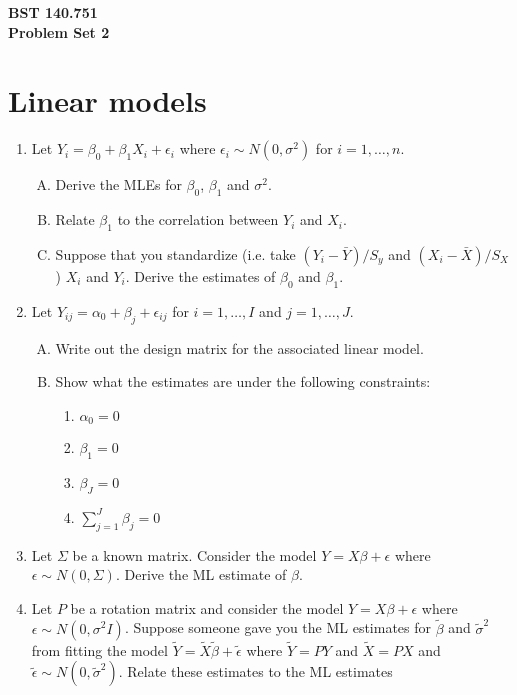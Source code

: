 \documentclass[12pt]{article}
\begin{document}
\noindent
{\bf BST 140.751 \\ Problem Set 2} \\

\section{Linear models}
\begin{enumerate}[1.]
\item Let $Y_i = \beta_0 + \beta_1 X_i + \epsilon_i$ where $\epsilon_i \sim N(0,\sigma^2)$ for $i=1,\ldots,n$.
  \begin{enumerate}[A.]
  \item Derive the MLEs for $\beta_0$, $\beta_1$ and $\sigma^2$.
  \item Relate $\beta_1$ to the correlation between $Y_i$ and $X_i$.
  \item Suppose that you standardize (i.e. take $(Y_i - \bar Y) / S_y$ and $(X_i - \bar X) / S_X$) $X_i$ and $Y_i$. Derive
    the estimates of $\beta_0$ and $\beta_1$.
  \end{enumerate}
\item Let $Y_{ij} = \alpha_0 + \beta_j + \epsilon_{ij}$ for $i = 1,\ldots, I$ and $j = 1,\ldots, J$.
  \begin{enumerate}[A.]
  \item Write out the design matrix for the associated linear model.
  \item Show what the estimates are under the following constraints:
    \begin{enumerate}
    \item $\alpha_0 = 0$
    \item $\beta_1 = 0$
    \item $\beta_J = 0$
    \item $\sum_{j=1}^J \beta_j = 0$
    \end{enumerate}
  \end{enumerate}
\item Let $\Sigma$ be a known matrix. Consider the model $Y = X\beta + \epsilon$ where $\epsilon \sim N(0, \Sigma)$. 
  Derive the ML estimate of $\beta$.
\item Let $P$ be a rotation matrix and consider the model $Y = X\beta
  + \epsilon$ where $\epsilon \sim N(0, \sigma^2 I)$.  Suppose someone gave you the
  ML estimates for $\tilde \beta$ and $\tilde \sigma^2$ from fitting
  the model $\tilde Y = \tilde X \tilde \beta + \tilde \epsilon$ where
  $\tilde Y = P Y$ and $\tilde X = PX$ and $\tilde \epsilon \sim N(0,
  \tilde \sigma^2)$. Relate these estimates to the ML estimates

\end{enumerate}
\end{document}
